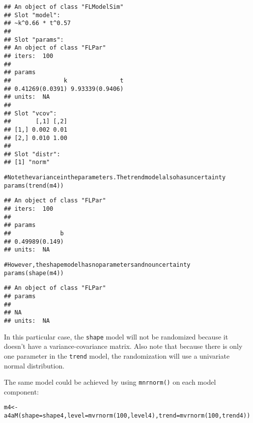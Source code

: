 \documentclass[a4paper,english,10pt]{article}\usepackage[]{graphicx}\usepackage[]{color}
\makeatletter
\newcommand{\hlnum}[1]{\textcolor[rgb]{0.2,0.2,0.2}{#1}}%
\newcommand{\hlcom}[1]{\textcolor[rgb]{0.2,0.267,0.4}{#1}}%
\newcommand{\hlstd}[1]{\textcolor[rgb]{0,0,0}{#1}}%
\newcommand{\hlkwb}[1]{\textcolor[rgb]{0.361,0.506,0.596}{#1}}%
\newcommand{\hlkwc}[1]{\textcolor[rgb]{0.361,0.506,0.596}{#1}}%
\newcommand{\hlkwd}[1]{\textcolor[rgb]{0.361,0.506,0.596}{#1}}%
\newenvironment{kframe}{%
 \def\at@end@of@kframe{}%
 \ifinner\ifhmode%
  \def\at@end@of@kframe{\end{minipage}}%
  \begin{minipage}{\columnwidth}%
 \fi\fi%
 \def\FrameCommand##1{\hskip\@totalleftmargin \hskip-\fboxsep
 \colorbox{shadecolor}{##1}\hskip-\fboxsep
     \hskip-\linewidth \hskip-\@totalleftmargin \hskip\columnwidth}%
 \MakeFramed {\advance\hsize-\width
   \@totalleftmargin\z@ \linewidth\hsize
   \@setminipage}}%
 {\par\unskip\endMakeFramed%
 \at@end@of@kframe}
\newenvironment{knitrout}{}{} %
\newcommand{\code}[1]{{\texttt{#1}}}
\makeatother
\begin{document}
\begin{knitrout}
\begin{kframe}
\begin{verbatim}
## An object of class "FLModelSim"
## Slot "model":
## ~k^0.66 * t^0.57
## 
## Slot "params":
## An object of class "FLPar"
## iters:  100 
## 
## params
##               k               t 
## 0.41269(0.0391) 9.93339(0.9406) 
## units:  NA 
## 
## Slot "vcov":
##       [,1] [,2]
## [1,] 0.002 0.01
## [2,] 0.010 1.00
## 
## Slot "distr":
## [1] "norm"
\end{verbatim}
\begin{alltt}
\hlcom{# Note the variance in the parameters. The trend model also has uncertainty}
\hlkwd{params}\hlstd{(}\hlkwd{trend}\hlstd{(m4))}
\end{alltt}
\begin{verbatim}
## An object of class "FLPar"
## iters:  100 
## 
## params
##              b 
## 0.49989(0.149) 
## units:  NA
\end{verbatim}
\begin{alltt}
\hlcom{# However, the shape model has no parameters and no uncertainty}
\hlkwd{params}\hlstd{(}\hlkwd{shape}\hlstd{(m4))}
\end{alltt}
\begin{verbatim}
## An object of class "FLPar"
## params
##    
## NA 
## units:  NA
\end{verbatim}
\end{kframe}
\end{knitrout}

In this particular case, the \code{shape} model will not be randomized because it doesn't have a variance-covariance matrix. Also note that because there is only one parameter in the \code{trend} model, the randomization will use a univariate normal distribution.

The same model could be achieved by using \code{mnrnorm()} on each model component:

\begin{knitrout}
\color{fgcolor}\begin{kframe}
\begin{alltt}
\hlstd{m4} \hlkwb{<-} \hlkwd{a4aM}\hlstd{(}\hlkwc{shape}\hlstd{=shape4,} \hlkwc{level}\hlstd{=}\hlkwd{mvrnorm}\hlstd{(}\hlnum{100}\hlstd{, level4),} \hlkwc{trend}\hlstd{=}\hlkwd{mvrnorm}\hlstd{(}\hlnum{100}\hlstd{, trend4))}
\end{alltt}
\end{kframe}
\end{knitrout}

\end{document}
